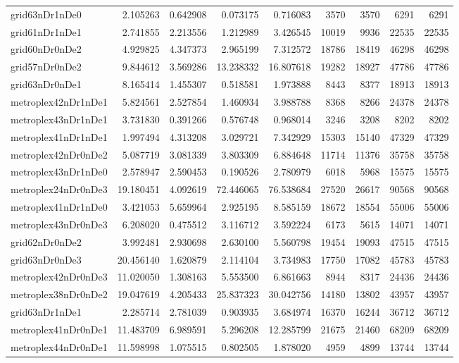 \begin{longtable}{|l|r|r|r|r|r|r|r|r|}
grid63nDr1nDe0 & 2.105263 & 0.642908 & 0.073175 & 0.716083 & 3570 & 3570 & 6291 & 6291 \\
grid61nDr1nDe1 & 2.741855 & 2.213556 & 1.212989 & 3.426545 & 10019 & 9936 & 22535 & 22535 \\
grid60nDr0nDe2 & 4.929825 & 4.347373 & 2.965199 & 7.312572 & 18786 & 18419 & 46298 & 46298 \\
grid57nDr0nDe2 & 9.844612 & 3.569286 & 13.238332 & 16.807618 & 19282 & 18927 & 47786 & 47786 \\
grid63nDr0nDe1 & 8.165414 & 1.455307 & 0.518581 & 1.973888 & 8443 & 8377 & 18913 & 18913 \\
metroplex42nDr1nDe1 & 5.824561 & 2.527854 & 1.460934 & 3.988788 & 8368 & 8266 & 24378 & 24378 \\
metroplex43nDr1nDe1 & 3.731830 & 0.391266 & 0.576748 & 0.968014 & 3246 & 3208 & 8202 & 8202 \\
metroplex41nDr1nDe1 & 1.997494 & 4.313208 & 3.029721 & 7.342929 & 15303 & 15140 & 47329 & 47329 \\
metroplex42nDr0nDe2 & 5.087719 & 3.081339 & 3.803309 & 6.884648 & 11714 & 11376 & 35758 & 35758 \\
metroplex43nDr1nDe0 & 2.578947 & 2.590453 & 0.190526 & 2.780979 & 6018 & 5968 & 15575 & 15575 \\
metroplex24nDr0nDe3 & 19.180451 & 4.092619 & 72.446065 & 76.538684 & 27520 & 26617 & 90568 & 90568 \\
metroplex41nDr1nDe0 & 3.421053 & 5.659964 & 2.925195 & 8.585159 & 18672 & 18554 & 55006 & 55006 \\
metroplex43nDr0nDe3 & 6.208020 & 0.475512 & 3.116712 & 3.592224 & 6173 & 5615 & 14071 & 14071 \\
grid62nDr0nDe2 & 3.992481 & 2.930698 & 2.630100 & 5.560798 & 19454 & 19093 & 47515 & 47515 \\
grid63nDr0nDe3 & 20.456140 & 1.620879 & 2.114104 & 3.734983 & 17750 & 17082 & 45783 & 45783 \\
metroplex42nDr0nDe3 & 11.020050 & 1.308163 & 5.553500 & 6.861663 & 8944 & 8317 & 24436 & 24436 \\
metroplex38nDr0nDe2 & 19.047619 & 4.205433 & 25.837323 & 30.042756 & 14180 & 13802 & 43957 & 43957 \\
grid63nDr1nDe1 & 2.285714 & 2.781039 & 0.903935 & 3.684974 & 16370 & 16244 & 36712 & 36712 \\
metroplex41nDr0nDe1 & 11.483709 & 6.989591 & 5.296208 & 12.285799 & 21675 & 21460 & 68209 & 68209 \\
metroplex44nDr0nDe1 & 11.598998 & 1.075515 & 0.802505 & 1.878020 & 4959 & 4899 & 13744 & 13744 \\

\end{longtable}
